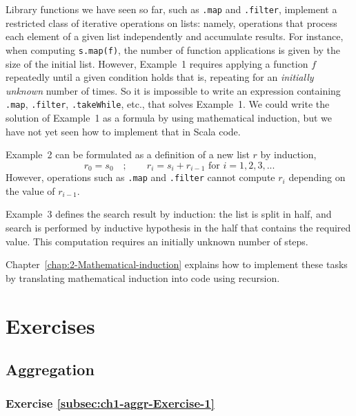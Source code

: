 Library functions we have seen so far, such as \texttt{}\lstinline!.map!
and \lstinline!.filter!, implement a restricted class of iterative
operations on lists: namely, operations that process each element
of a given list independently and accumulate results. For instance,
when computing \lstinline!s.map(f)!, the number of function applications
is given by the size of the initial list. However, Example\ 1 requires
applying a function $f$ repeatedly until a given condition holds
\textendash{} that is, repeating for an \emph{initially unknown} number
of times. So it is impossible to write an expression containing \lstinline!.map!,
\lstinline!.filter!, \lstinline!.takeWhile!, etc., that solves Example\ 1.
We could write the solution of Example\ 1 as a formula by using mathematical
induction, but we have not yet seen how to implement that in Scala
code. 

Example\ 2 can be formulated as a definition of a new list $r$ by
induction, 
\[
r_{0}=s_{0}\quad;\quad\quad r_{i}=s_{i}+r_{i-1}\text{ for }i=1,2,3,...
\]
However, operations such as \texttt{}\lstinline!.map! and \texttt{}\lstinline!.filter!
cannot compute $r_{i}$ depending on the value of $r_{i-1}$.

Example\ 3 defines the search result by induction: the list is split
in half, and search is performed by inductive hypothesis in the half
that contains the required value. This computation requires an initially
unknown number of steps.

Chapter\ \ref{chap:2-Mathematical-induction} explains how to implement
these tasks by translating mathematical induction into code using
recursion.

\section{Exercises\label{sec:Chapter-1-Exercises}}

\subsection{Aggregation}

\subsubsection{Exercise \label{subsec:ch1-aggr-Exercise-1}\ref{subsec:ch1-aggr-Exercise-1}}

